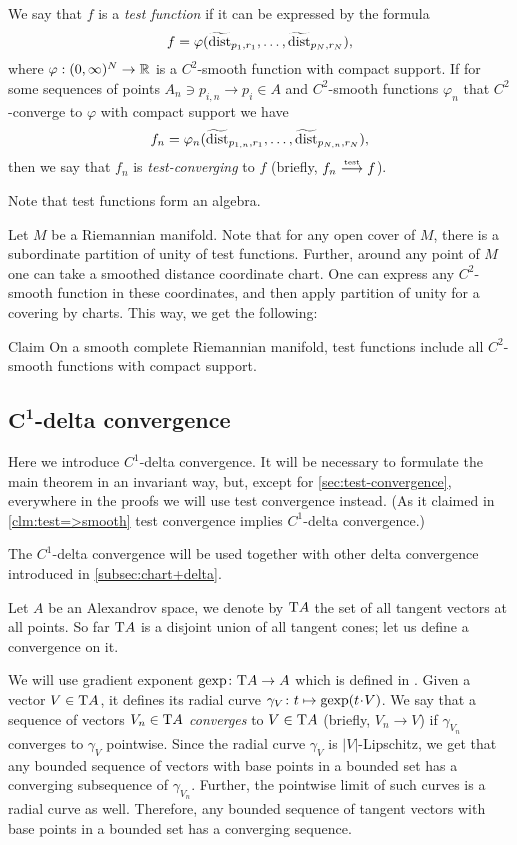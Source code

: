 We say that $f$ is a \emph{test function} if it can be expressed by the formula
$$f=\varphi( \widetilde{\operatorname{\rm dist}}_{p_1,r_1}, \dots,   \widetilde{\operatorname{\rm dist}}_{p_N,r_N}),$$
where $\varphi:(0,\infty)^N\to\mathbb{R}$ is a $C^2$-smooth function with compact support.
If for some sequences of points $A_n\ni p_{i,n}\to p_i\in A$ and $C^2$-smooth functions $\varphi_n$ that $C^2$-converge to $\varphi$ with compact support we have
$$f_n=\varphi_n( \widetilde{\operatorname{\rm dist}}_{p_{1,n},r_1},\dots,   \widetilde{\operatorname{\rm dist}}_{p_{N,n},r_N}),$$
then we say that $f_n$ is \emph{test-converging} to $f$ (briefly, $f_n\zz\testto f$).

Note that test functions form an algebra.

Let $M$ be a Riemannian manifold.
Note that for any open cover of $M$, there is a subordinate partition of unity of test functions.
Further, around any point of $M$ one can take a smoothed distance 
coordinate chart.
One can express any $C^2$-smooth function in these 
coordinates, and then apply partition of unity for a covering by charts.
This way, we get the following:

\begin{thm}{Claim}
On a smooth complete Riemannian manifold, test functions
include all $C^2$-smooth functions with compact support.
\end{thm}


\subsection[$C^1$-delta convergence]{$\bm{C^1}$-delta convergence}\label{sec:concept}

Here we introduce $C^1$-delta convergence.
It will be necessary to formulate the main theorem in an invariant way, but, except for \ref{sec:test-convergence}, everywhere in the proofs we will use test convergence instead.
(As it claimed in \ref{clm:test=>smooth} test convergence implies $C^1$-delta convergence.)

The $C^1$-delta convergence will be used together with other delta convergence introduced in \ref{subsec:chart+delta}.

Let $A$ be an Alexandrov space, we denote by $\mathrm{T} A$ the set of all tangent vectors at all points.
So far $\mathrm{T} A$ is a disjoint union of all tangent cones;
let us define a convergence on it.

We will use gradient exponent $\mathop{\rm gexp}\colon \mathrm{T} A\to A$ which is defined in \cite{AKP}.
Given a vector $V\in \mathrm{T} A$, it defines its radial curve $\gamma_{V}\:t\zz\mapsto \gexp (t\cdot V)$.
We say that a sequence of vectors $V_n\in \mathrm{T} A$ \emph{converges} to $V\in \mathrm{T} A$ (briefly, $V_n\to V$) if $\gamma_{V_n}$ converges to $\gamma_V$ pointwise.
Since the radial curve $\gamma_V$ is $|V|$-Lipschitz, we get that any bounded sequence of vectors with base points in a bounded set has a converging subsequence of $\gamma_{V_n}$.
Further, the pointwise limit of such curves is a radial curve as well.
Therefore, any bounded sequence of tangent vectors with base points in a bounded set has a converging sequence.


